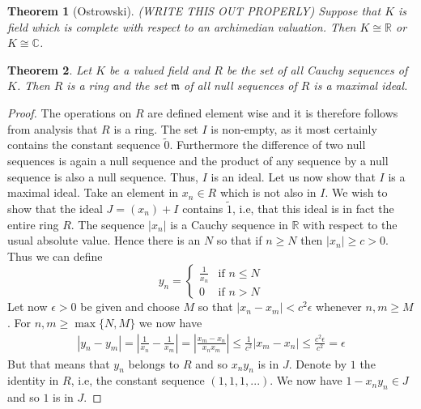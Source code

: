 \documentclass{article}
\newtheorem{theorem}{Theorem}[section]
\newcommand{\mfrak}[1]{\mathfrak{#1}}
\newcommand{\mbb}[1]{\mathbb{#1}}
\begin{document}
\begin{theorem}[Ostrowski]
    (WRITE THIS OUT PROPERLY)
    Suppose that $K$ is field which is complete with respect to an archimedian valuation. Then $K \cong \mbb R$ or $K \cong \mbb C$.
\end{theorem}


\begin{theorem}
    Let $K$ be a valued field and $R$ be the set of all Cauchy sequences of $K$. Then $R$ is a ring and the set $\mfrak m$ of all null sequences of $R$ is a maximal ideal.
\end{theorem}
\begin{proof}
    The operations on $R$ are defined element wise and it is therefore follows from analysis that $R$ is a ring. The set $I$ is non-empty, as it most certainly contains the constant sequence $\tilde 0$. Furthermore the difference of two null sequences is again a null sequence and the product of any sequence by a null sequence is also a null sequence. Thus, $I$ is an ideal. Let us now show that $I$ is a maximal ideal. Take an element in $x_n \in R$ which is not also in $I$. We wish to show that the ideal $J = (x_n) + I$ contains $\tilde 1$, i.e, that this ideal is in fact the entire ring $R$. The sequence $|x_n|$ is a Cauchy sequence in $\mbb R$ with respect to the usual absolute value. Hence there is an $N$ so that if $n \geq N$ then $|x_n| \geq c > 0$. Thus we can define 
    $$y_n = \begin{cases} \frac{1}{x_n} & \text{if } n \leq N \\ 0 & \text{if } n > N \end{cases}$$
    Let now $\epsilon > 0$ be given and choose $M$ so that $|x_n - x_m| < c^2 \epsilon$ whenever $n,m \geq M$. For $n,m \geq \max\{N,M\}$ we now have
    \begin{align*}
        |y_n - y_m| = |\frac{1}{x_n} - \frac{1}{x_m}| = |\frac{x_m - x_n}{x_n x_m}| \leq \frac{1}{c^2} |x_m - x_n| \leq \frac{c^2 \epsilon}{c^2} = \epsilon
    \end{align*}
    But that means that $y_n$ belongs to $R$ and so $x_n y_n$ is in $J$. Denote by $1$ the identity in $R$, i.e, the constant sequence $(1,1,1, ...)$. We now have $1 - x_n y_n \in J$ and so $1$ is in $J$.

\end{proof}
\end{document}
